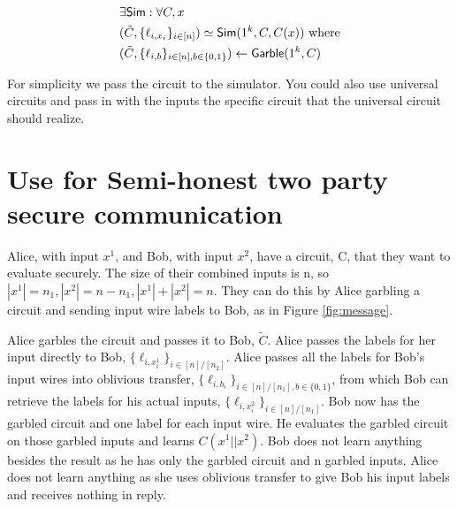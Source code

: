 \begin{align*}
&\exists \mathsf{Sim} : \forall C, x\\
&(\tilde{C}, \{\ell_{i,x_i}\}_{i \in [n]}) \simeq \mathsf{Sim}(1^k, C, C(x)) \text{ where} \\
&(\tilde{C}, \{\ell_{i,b}\}_{i \in [n], b \in \{0,1\}}) \leftarrow \mathsf{Garble}(1^k, C) 
\end{align*}

For simplicity we pass the circuit to the simulator.
You could also use universal circuits and pass 
in with the inputs the specific circuit that the universal circuit should realize. 



\section{Use for Semi-honest two party secure communication}
Alice, with input $x^1$, and Bob, with input $x^2$, have a circuit, C, that they want to evaluate securely. 
The size of their combined inputs is n, so $|x^1| = n_1, |x^2| = n - n_1, |x^1| + |x^2| = n$.
They can do this by Alice garbling a circuit and sending input wire labels to Bob, as in Figure \ref{fig:message}.

Alice garbles the circuit and passes it to Bob, $\tilde{C}$.
Alice passes the labels for her input directly to Bob, $\{\ell_{i, x^1_i}\}_{i \in [n] / [n_2]}$.
Alice passes all the labels for Bob's input wires into oblivious transfer, $\{\ell_{i, b_i}\}_{i \in [n] / [n_1], b \in \{0,1\}}$, 
from which Bob can retrieve the labels for his actual inputs, $\{\ell_{i, x^2_i}\}_{i \in [n] / [n_1]}$.
Bob now has the garbled circuit and one label for each input wire. 
He evaluates the garbled circuit on those garbled inputs and learns $C(x^1||x^2)$.
Bob does not learn anything besides the result as he has only the garbled circuit and n garbled inputs.
Alice does not learn anything as she uses oblivious transfer to give Bob his input labels and receives nothing in reply.

